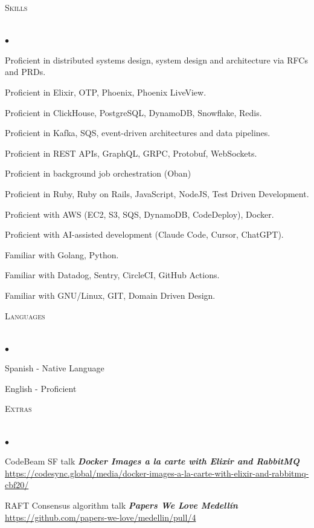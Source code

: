 \documentclass[a4paper]{article}
\newcommand{\lineunder}{\vspace*{-8pt} \\ \hspace*{-18pt} \hrulefill \\}
\newcommand{\header}[1]{{\hspace*{-15pt}\vspace*{6pt}
  \textsc{#1}} \vspace*{-6pt} \lineunder}
\newenvironment{achievements}{\begin{list}{$\bullet$}{\topsep 0pt \itemsep
  -2pt}}{\vspace*{4pt}\end{list}}
\newcommand{\emphasys}[1]{\textbf{\emph{#1}}}
\begin{document}
  \header{Skills}
  \begin{achievements}
  \item {Proficient in distributed systems design, system design and architecture via RFCs and PRDs.}
  \item {Proficient in Elixir, OTP, Phoenix, Phoenix LiveView.}
  \item {Proficient in ClickHouse, PostgreSQL, DynamoDB, Snowflake, Redis.}
  \item {Proficient in Kafka, SQS, event-driven architectures and data pipelines.}
  \item {Proficient in REST APIs, GraphQL, GRPC, Protobuf, WebSockets.}
  \item {Proficient in background job orchestration (Oban)}
  \item {Proficient in Ruby, Ruby on Rails, JavaScript, NodeJS, Test Driven Development.}
  \item {Proficient with AWS (EC2, S3, SQS, DynamoDB, CodeDeploy), Docker.}
  \item {Proficient with AI-assisted development (Claude Code, Cursor, ChatGPT).}
  \item {Familiar with Golang, Python.}
  \item {Familiar with Datadog, Sentry, CircleCI, GitHub Actions.}
  \item {Familiar with GNU/Linux, GIT, Domain Driven Design.}
  \end{achievements}

  \header{Languages}
  \begin{achievements}
  \item{Spanish - Native Language}
  \item{English - Proficient}
  \end{achievements}

  \header{Extras}
  \begin{achievements}
  \item{CodeBeam SF talk \emphasys{Docker Images a la carte with Elixir and RabbitMQ} \url{https://codesync.global/media/docker-images-a-la-carte-with-elixir-and-rabbitmq-cbf20/}}
  \item{RAFT Consensus algorithm talk \emphasys{Papers We Love Medell\'in} \url{https://github.com/papers-we-love/medellin/pull/4}}
  \end{achievements}
  
\end{document}
